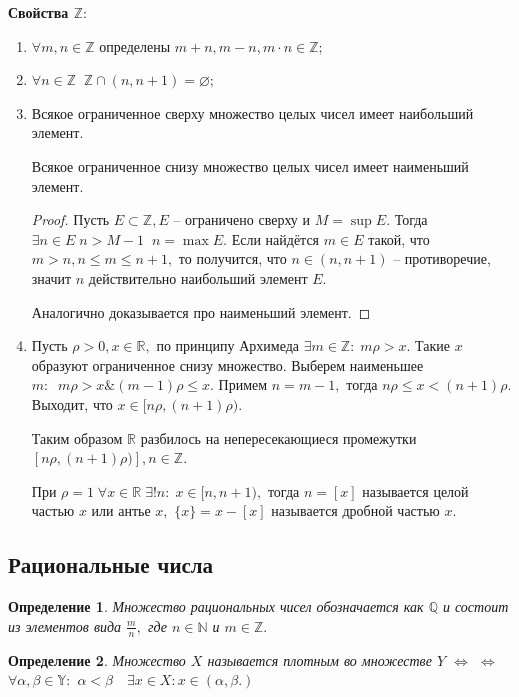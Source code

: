 \documentclass{article}
\newtheorem{Definition}{Определение}[section]
\begin{document}
\par\medskip \textbf{Свойства $\mathbb{Z}:$}\par
\begin{enumerate}
\item $\forall m, n\in \mathbb{Z}$ определены $m+n, m-n, m\cdot n \in\mathbb{Z};$
\item $\forall n\in\mathbb{Z}\;\; \mathbb{Z}\cap(n, n+1)=\varnothing;$
\item Всякое ограниченное сверху множество целых чисел имеет наибольший элемент.
\par Всякое ограниченное снизу множество целых чисел имеет наименьший элемент.
\begin{proof}
Пусть $E\subset\mathbb{Z}, E$ -- ограничено сверху и $M=\sup E.$ Тогда $\exists n\in E \; n>M-1 \;\; n =\max E.$ Если найдётся $m\in E$ такой, что $m>n, n\leq m\leq n+1,$ то получится, что $n\in(n, n+1)$ -- противоречие, значит $n$ действительно наибольший элемент $E.$

Аналогично доказывается про наименьший элемент.
\end{proof}
\item Пусть $\rho>0, x\in\mathbb{R},$ по принципу Архимеда $\exists m\in\mathbb{Z}: \; m\rho>x.$ Такие $x$ образуют ограниченное снизу множество. Выберем наименьшее $m:\;\; m\rho>x \mathbin{\&} (m-1)\rho\leq x.$ Примем $n=m-1,$ тогда $n\rho\leq x< (n+1)\rho.$ Выходит, что $x\in[n\rho, (n+1)\rho).$ 

Таким образом $\mathbb{R}$ разбилось на непересекающиеся промежутки $[n\rho, (n+1)\rho)], n\in\mathbb{Z}.$

При $\rho=1 \; \forall x\in\mathbb{R} \; \exists! n: \; x\in[n,n+1),$ тогда $n=[x]$ называется целой частью $x$ или антье $x,$ $\{x\}=x-[x]$ называется дробной частью $x.$
\end{enumerate}
\subsection{Рациональные числа}

\begin{Definition}
Множество рациональных чисел обозначается как $\mathbb{Q}$ и состоит из элементов вида $\frac{m}{n},$ где $n\in \mathbb{N}$ и $m\in\mathbb{Z}.$
\end{Definition}

\begin{Definition}
Множество $X$ называется плотным во множестве $Y$ \quad $\Leftrightarrow$ \quad $\Leftrightarrow$ $\forall \alpha, \beta \in \mathbb{Y}:$ $\alpha<\beta \quad \exists x\in X: x\in(\alpha,\beta.)$
\end{Definition}
\end{document}
